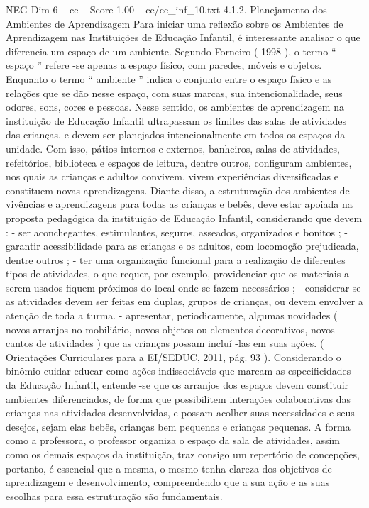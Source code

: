 \begin{textsample}{NEG Dim 6 – ce – Score 1.00 – ce/ce\_inf\_10.txt}  \label{ex:f6_neg_259}
4.1.2.
Planejamento dos Ambientes de Aprendizagem Para iniciar uma reflexão sobre os Ambientes de Aprendizagem nas Instituições de Educação Infantil, é interessante analisar o que diferencia um espaço de um ambiente.
Segundo Forneiro ( 1998 ), o termo “ espaço ” refere -se apenas a espaço físico, com paredes, móveis e objetos.
Enquanto o termo “ ambiente ” indica o conjunto entre o espaço físico e as relações que se dão nesse espaço, com suas marcas, sua intencionalidade, seus odores, sons, cores e pessoas.
Nesse sentido, os ambientes de aprendizagem na instituição de Educação Infantil ultrapassam os limites das salas de atividades das crianças, e devem ser planejados intencionalmente em todos os espaços da unidade.
Com isso, pátios internos e externos, banheiros, salas de atividades, refeitórios, biblioteca e espaços de leitura, dentre outros, configuram ambientes, nos quais as crianças e adultos convivem, vivem experiências diversificadas e constituem novas aprendizagens.
Diante disso, a estruturação dos ambientes de vivências e aprendizagens para todas as crianças e bebês, deve estar apoiada na proposta pedagógica da instituição de Educação Infantil, considerando que devem : - ser aconchegantes, estimulantes, seguros, asseados, organizados e bonitos ; - garantir acessibilidade para as crianças e os adultos, com locomoção prejudicada, dentre outros ; - ter uma organização funcional para a realização de diferentes tipos de atividades, o que requer, por exemplo, providenciar que os materiais a serem usados fiquem próximos do local onde se fazem necessários ; - considerar se as atividades devem ser feitas em duplas, grupos de crianças, ou devem envolver a atenção de toda a turma. - apresentar, periodicamente, algumas novidades ( novos arranjos no mobiliário, novos objetos ou elementos decorativos, novos cantos de atividades ) que as crianças possam incluí -las em suas ações. ( Orientações Curriculares para a EI/SEDUC, 2011, pág. 93 ).
Considerando o binômio cuidar-educar como ações indissociáveis que marcam as especificidades da Educação Infantil, entende -se que os arranjos dos espaços devem constituir ambientes diferenciados, de forma que possibilitem interações colaborativas das crianças nas atividades desenvolvidas, e possam acolher suas necessidades e seus desejos, sejam elas bebês, crianças bem pequenas e crianças pequenas.
A forma como a professora, o professor organiza o espaço da sala de atividades, assim como os demais espaços da instituição, traz consigo um repertório de concepções, portanto, é essencial que a mesma, o mesmo tenha clareza dos objetivos de aprendizagem e desenvolvimento, compreendendo que a sua ação e as suas escolhas para essa estruturação são fundamentais.

\end{textsample}

